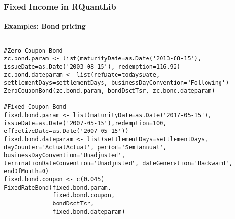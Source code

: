 \documentclass[smaller,compress]{beamer}
\begin{document}
\begin{frame}[fragile]
	\frametitle{Fixed Income in RQuantLib}
	\framesubtitle{Examples: Bond pricing}	
\begin{columns}[c] %
			\lstset{language=R,basicstyle=\tiny}
				\begin{lstlisting}
#Zero-Coupon Bond
zc.bond.param <- list(maturityDate=as.Date('2013-08-15'), issueDate=as.Date('2003-08-15'), redemption=116.92)
zc.bond.dateparam <- list(refDate=todaysDate, settlementDays=settlementDays, businessDayConvention='Following')
ZeroCouponBond(zc.bond.param, bondDsctTsr, zc.bond.dateparam)

#Fixed-Coupon Bond
fixed.bond.param <- list(maturityDate=as.Date('2017-05-15'), issueDate=as.Date('2007-05-15'),redemption=100, effectiveDate=as.Date('2007-05-15'))
fixed.bond.dateparam <- list(settlementDays=settlementDays,                            dayCounter='ActualActual', period='Semiannual',                           businessDayConvention='Unadjusted', terminationDateConvention='Unadjusted', dateGeneration='Backward', endOfMonth=0)
fixed.bond.coupon <- c(0.045)
FixedRateBond(fixed.bond.param,
              fixed.bond.coupon,
              bondDsctTsr,
              fixed.bond.dateparam)
\end{lstlisting}

\end{columns}
\end{frame}
\end{document}
